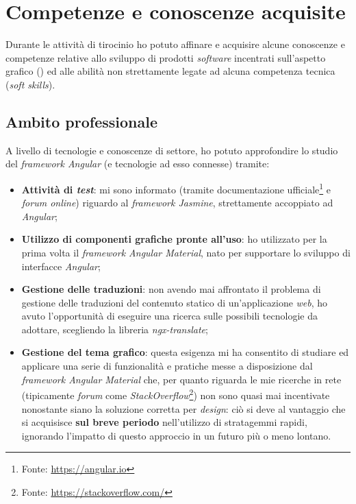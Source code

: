 \section{Competenze e conoscenze acquisite}
Durante le attività di tirocinio ho potuto affinare e acquisire alcune conoscenze e competenze relative allo sviluppo di prodotti \textit{software} incentrati sull'aspetto grafico () ed alle abilità non strettamente legate ad alcuna competenza tecnica (\textit{soft skills}).
\subsection*{Ambito professionale}
A livello di tecnologie e conoscenze di settore, ho potuto approfondire lo studio del \textit{framework Angular} (e tecnologie ad esso connesse) tramite:
\begin{itemize}
    \item \textbf{Attività di \textit{test}}: mi sono informato (tramite documentazione ufficiale\footnote{Fonte: \href{https://angular.io/guide/testing}{https://angular.io}} e \textit{forum online}) riguardo al \textit{framework Jasmine}, strettamente accoppiato ad \textit{Angular};
    \item \textbf{Utilizzo di componenti grafiche pronte all'uso}: ho utilizzato per la prima volta il \textit{framework Angular Material}, nato per supportare lo sviluppo di interfacce \textit{Angular};
    \item \textbf{Gestione delle traduzioni}: non avendo mai affrontato il problema di gestione delle traduzioni del contenuto statico di un'applicazione \textit{web}, ho avuto l'opportunità di eseguire una ricerca sulle possibili tecnologie da adottare, scegliendo la libreria \textit{ngx-translate};
    \item \textbf{Gestione del tema grafico}: questa esigenza mi ha consentito di studiare ed applicare una serie di funzionalità e pratiche messe a disposizione dal \textit{framework Angular Material} che, per quanto riguarda le mie ricerche in rete (tipicamente \textit{forum} come \textit{StackOverflow}\footnote{Fonte: \href{https://stackoverflow.com/}{https://stackoverflow.com/}})
        non sono quasi mai incentivate nonostante siano la soluzione corretta per \textit{design}: ciò si deve al vantaggio che si acquisisce \textbf{sul breve periodo} nell'utilizzo di stratagemmi rapidi, ignorando l'impatto di questo approccio in un futuro più o meno lontano.
\end{itemize}

